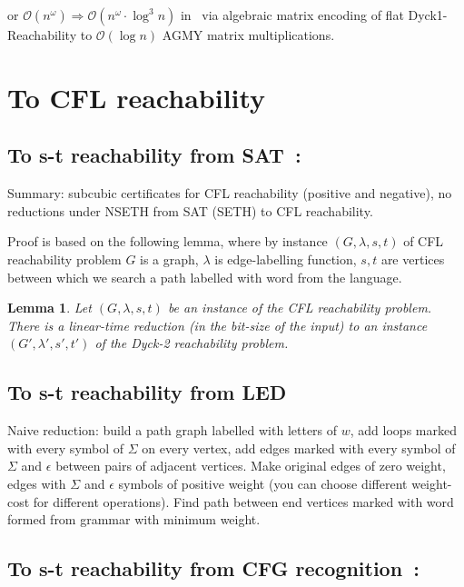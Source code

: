 \documentclass{amsart}
\newtheorem*{lemma}{Lemma}
\begin{document}
	or $\mathcal{O}(n^{\omega}) \Rightarrow \mathcal{O}(n^{\omega} \cdot \log^3 n)$ in~\cite{bradford2017efficient} via algebraic matrix encoding of flat Dyck1-Reachability to $\mathcal{O}(\log n)$ AGMY matrix multiplications.
	
	\section{To CFL reachability}
	
	\subsection{To s-t reachability from SAT~\cite{chistikov2021subcubic}:\\}
	\label{dmchistikov}
	
	Summary: subcubic certificates for CFL reachability (positive and negative), no reductions under NSETH from SAT (SETH) to CFL reachability.
	
	Proof is based on the following lemma, where by instance $(G, \lambda, s, t)$ of CFL reachability problem $G$ is a graph, $\lambda$ is edge-labelling function, $s, t$ are vertices between which we search a path labelled with word from the language. 
	
	\begin{lemma}
		Let $(G,\lambda,s,t)$ be an instance of the CFL reachability problem. There is a linear-time reduction (in the bit-size of the input) to an instance $(G',\lambda',s',t')$ of the Dyck-2 reachability problem.
	\end{lemma}
	
	\subsection{To s-t reachability from LED}
	\label{cfl_to_led}
	
	Naive reduction: build a path graph labelled with letters of $w$, add loops marked with every symbol of $\Sigma$ on every vertex, add edges marked with every symbol of $\Sigma$ and $\epsilon$ between pairs of adjacent vertices. Make original edges of zero weight, edges with $\Sigma$ and $\epsilon$ symbols of positive weight (you can choose different weight-cost for different operations). Find path between end vertices marked with word formed from grammar with minimum weight.
	
	\subsection{To s-t reachability from CFG recognition~\cite{10.1145/3158118}:\\}
	\label{stcfl_to_cfg}
	
\end{document}
